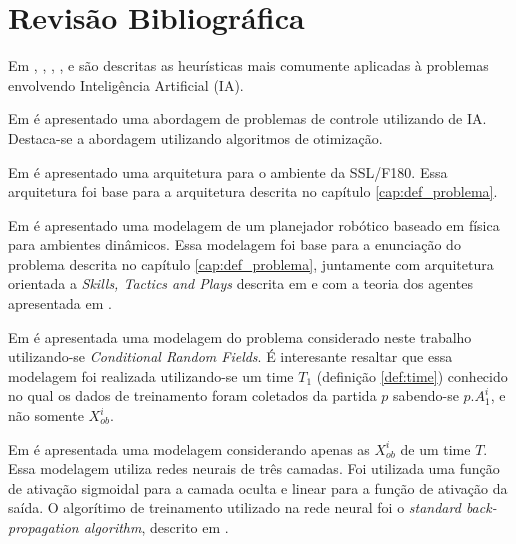\chapter{Revisão Bibliográfica}\label{cap:rev_bibliografica}


Em \cite{russellnorvig}, \cite{haykin2001redes}, \cite{kosko1997fuzzy}, \cite{passos2005datamining},
\cite{doringo2004ant} e \cite{bertsimas1993simulated} são descritas as heurísticas
mais comumente aplicadas à problemas envolvendo Inteligência Artificial (IA).

Em \cite{yoneyama2004ia} é apresentado uma abordagem de problemas de controle utilizando de IA. Destaca-se
a abordagem utilizando algoritmos de otimização.

Em \cite{felixnavarro} é apresentado uma arquitetura para o ambiente da SSL/F180. Essa arquitetura foi base
para a arquitetura descrita no capítulo \ref{cap:def_problema}.

Em \cite{zickler} é apresentado uma modelagem de um planejador robótico baseado em física para ambientes dinâmicos. 
Essa modelagem foi base para a enunciação do problema descrita no capítulo \ref{cap:def_problema}, juntamente com 
arquitetura orientada a \textit{Skills, Tactics and Plays} descrita em \cite{bowling2003plays} e com a teoria dos 
agentes apresentada em \cite{russellnorvig}.

Em \cite{vail2008crf} é apresentada uma modelagem do problema considerado neste trabalho
utilizando-se \textit{Conditional Random Fields}. É interesante resaltar que essa modelagem
foi realizada utilizando-se um time $T_1$ (definição \ref{def:time}) conhecido no qual os dados
de treinamento foram coletados da partida $p$ sabendo-se $p.A_1^{i}$, e não somente $X_{ob}^{i}$.

Em \cite{sheng2005motionprediction} é apresentada uma modelagem considerando apenas as $X_{ob}^{i}$
de um time $T$. Essa modelagem utiliza redes neurais de três camadas. Foi utilizada
uma função de ativação sigmoidal para a camada oculta e linear para a função de 
ativação da saída. O algorítimo de treinamento utilizado na rede neural foi o \textit{standard back-propagation
algorithm}, descrito em \cite{haykin2001redes}.
